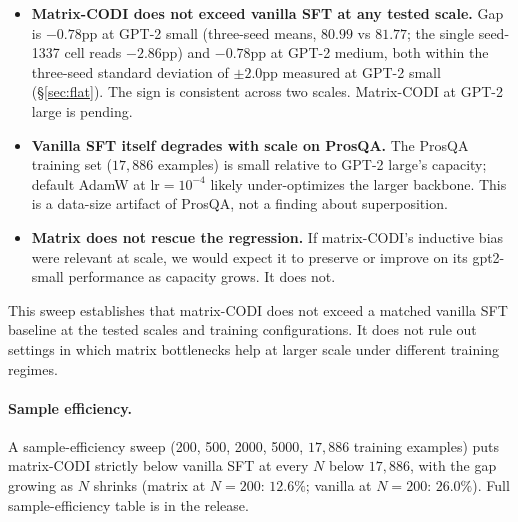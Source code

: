 \begin{itemize}
\setlength\itemsep{2pt}
\item \textbf{Matrix-CODI does not exceed vanilla SFT at any tested
      scale.} Gap is $-0.78$pp at GPT-2 small (three-seed means, $80.99$ vs $81.77$; the single seed-1337 cell reads $-2.86$pp) and $-0.78$pp at GPT-2
      medium, both within the three-seed standard deviation of
      $\pm 2.0$pp measured at GPT-2 small (\S\ref{sec:flat}). The
      sign is consistent across two scales. Matrix-CODI at GPT-2
      large is pending.
\item \textbf{Vanilla SFT itself degrades with scale on ProsQA.}
      The ProsQA training set ($17{,}886$ examples) is small relative
      to GPT-2 large's capacity; default AdamW at $\text{lr}=10^{-4}$
      likely under-optimizes the larger backbone. This is a data-size
      artifact of ProsQA, not a finding about superposition.
\item \textbf{Matrix does not rescue the regression.} If matrix-CODI's
      inductive bias were relevant at scale, we would expect it to
      preserve or improve on its gpt2-small performance as capacity
      grows. It does not.
\end{itemize}

This sweep establishes that matrix-CODI does not exceed a matched
vanilla SFT baseline at the tested scales and training configurations.
It does not rule out settings in which matrix bottlenecks help at
larger scale under different training regimes.

\paragraph{Sample efficiency.} A sample-efficiency sweep (200, 500,
2000, 5000, $17{,}886$ training examples) puts matrix-CODI strictly
below vanilla SFT at every $N$ below $17{,}886$, with the gap growing
as $N$ shrinks (matrix at $N=200$: $12.6\%$; vanilla at $N=200$:
$26.0\%$). Full sample-efficiency table is in the release.
